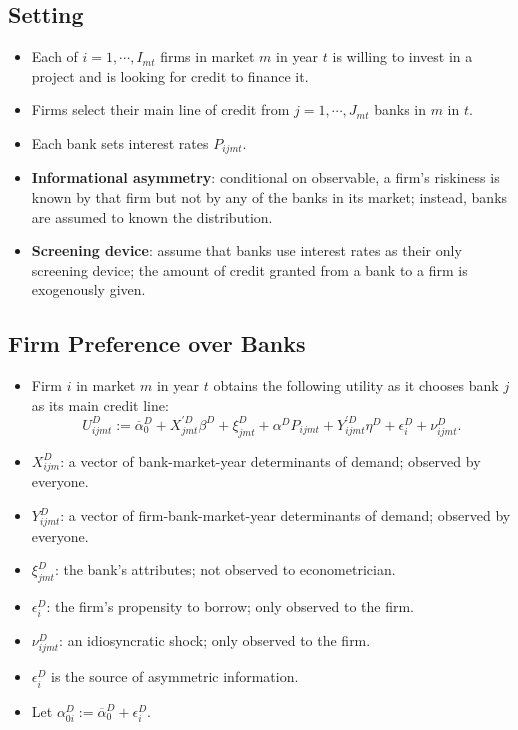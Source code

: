 \documentclass[
]{book}
\providecommand{\tightlist}{%
  \setlength{\itemsep}{0pt}\setlength{\parskip}{0pt}}
\begin{document}
\hypertarget{setting-6}{%
\subsection{Setting}\label{setting-6}}

\begin{itemize}
\tightlist
\item
  Each of \(i = 1, \cdots, I_{mt}\) firms in market \(m\) in year \(t\) is willing to invest in a project and is looking for credit to finance it.
\item
  Firms select their main line of credit from \(j = 1, \cdots, J_{mt}\) banks in \(m\) in \(t\).
\item
  Each bank sets interest rates \(P_{ijmt}\).
\item
  \textbf{Informational asymmetry}: conditional on observable, a firm's riskiness is known by that firm but not by any of the banks in its market; instead, banks are assumed to known the distribution.
\item
  \textbf{Screening device}: assume that banks use interest rates as their only screening device; the amount of credit granted from a bank to a firm is exogenously given.
\end{itemize}

\hypertarget{firm-preference-over-banks}{%
\subsection{Firm Preference over Banks}\label{firm-preference-over-banks}}

\begin{itemize}
\tightlist
\item
  Firm \(i\) in market \(m\) in year \(t\) obtains the following utility as it chooses bank \(j\) as its main credit line:
  \begin{equation}
  U_{ijmt}^D := \overline{\alpha}_0^D + X_{jmt}^{\prime D} \beta^D + \xi_{jmt}^D + \alpha^D P_{ijmt} + Y_{ijmt}^{\prime D} \eta^D + \epsilon_i^D + \nu_{ijmt}^D. \label{eq:demand-utility}
  \end{equation}
\item
  \(X_{ijm}^D\): a vector of bank-market-year determinants of demand; observed by everyone.
\item
  \(Y_{ijmt}^D\): a vector of firm-bank-market-year determinants of demand; observed by everyone.
\item
  \(\xi_{jmt}^D\): the bank's attributes; not observed to econometrician.
\item
  \(\epsilon_i^D\): the firm's propensity to borrow; only observed to the firm.
\item
  \(\nu_{ijmt}^D\): an idiosyncratic shock; only observed to the firm.
\item
  \(\epsilon_i^D\) is the source of asymmetric information.
\item
  Let \(\alpha_{0i}^D := \overline{\alpha}_0^D + \epsilon_i^D\).
\end{itemize}
\end{document}
